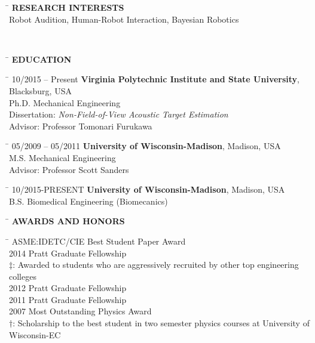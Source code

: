 \documentclass[11pt,letter]{article}
\begin{document}
\parbox{0.7\textwidth}{
\begin{tabbing}
	\hspace{1cm} \= \kill
	\>	{\bf \MakeUppercase{Research Interests}}\\
	\>	Robot Audition, Human-Robot Interaction, Bayesian Robotics
\end{tabbing}
}
\\
\begin{tabbing}
	\hspace{3cm}\=\kill
	\>  {\bf EDUCATION}
\end{tabbing}
\begin{tabbing}
	\hspace{3cm} \= \kill
	{\footnotesize 10/2015 -- Present} \> {\bf Virginia Polytechnic Institute and State University}, Blacksburg, USA\\
	\> Ph.D.  Mechanical Engineering \\
	\> Dissertation: {\it Non-Field-of-View Acoustic Target Estimation}\\
	\> Advisor: Professor Tomonari Furukawa
\end{tabbing}
\begin{tabbing}
	\hspace{3cm} \= \kill
	{\footnotesize 05/2009 -- 05/2011} \> {\bf University of Wisconsin-Madison}, Madison, USA\\
	\> M.S.  Mechanical Engineering \\
	\> Advisor: Professor Scott Sanders
\end{tabbing}
\begin{tabbing}
	\hspace{3cm} \= \kill
	{\footnotesize10/2015-PRESENT} \> {\bf University of Wisconsin-Madison}, Madison, USA\\
	\> B.S.  Biomedical Engineering (Biomecanics)\\
\end{tabbing}

\begin{tabbing}
	\hspace{3cm}\=\kill
	\>  {\bf AWARDS AND HONORS}
\end{tabbing}
\begin{tabbing}
	\hspace{3cm} \=  \> ASME:IDETC/CIE Best Student Paper Award\\
	2014 \> Pratt Graduate Fellowship\\
	\> 	$\ddagger$: Awarded to students who are aggressively recruited by other top engineering colleges\\
	2012 \> Pratt Graduate Fellowship\\
	2011 \> Pratt Graduate Fellowship\\
	2007 \> Most Outstanding Physics Award\\
	\> $\dagger$: Scholarship to the best student in two semester physics courses at University of Wisconsin-EC\\
\end{tabbing}
\end{document}
